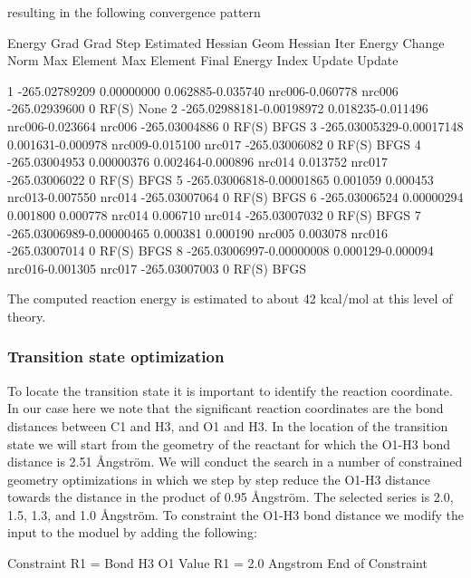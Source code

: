 resulting in the following convergence pattern

\begin{sourcelisting}
                      Energy     Grad     Grad          Step           Estimated  Hessian Geom Hessian
Iter     Energy       Change     Norm      Max  Element  Max  Element  Final Energy Index Update Update

 1   -265.02789209 0.00000000 0.062885-0.035740 nrc006-0.060778  nrc006 -265.02939600  0  RF(S)   None
 2   -265.02988181-0.00198972 0.018235-0.011496 nrc006-0.023664  nrc006 -265.03004886  0  RF(S)   BFGS
 3   -265.03005329-0.00017148 0.001631-0.000978 nrc009-0.015100  nrc017 -265.03006082  0  RF(S)   BFGS
 4   -265.03004953 0.00000376 0.002464-0.000896 nrc014 0.013752  nrc017 -265.03006022  0  RF(S)   BFGS
 5   -265.03006818-0.00001865 0.001059 0.000453 nrc013-0.007550  nrc014 -265.03007064  0  RF(S)   BFGS
 6   -265.03006524 0.00000294 0.001800 0.000778 nrc014 0.006710  nrc014 -265.03007032  0  RF(S)   BFGS
 7   -265.03006989-0.00000465 0.000381 0.000190 nrc005 0.003078  nrc016 -265.03007014  0  RF(S)   BFGS
 8   -265.03006997-0.00000008 0.000129-0.000094 nrc016-0.001305  nrc017 -265.03007003  0  RF(S)   BFGS
\end{sourcelisting}

The computed reaction energy is estimated to about 42 kcal/mol at this level of theory. 

\subsubsection{Transition state optimization}

To locate the transition state it is important to identify the reaction coordinate.
In our case here we note that the significant reaction coordinates are the bond distances between C1 
and H3, and O1 and H3. In the location of the transition state we
will start from the geometry of the reactant for which the O1-H3 bond distance is 
2.51 {\AA}ngstr\"{o}m. We will conduct the search in a number of constrained geometry 
optimizations in which we step by step reduce the O1-H3 distance towards the distance
in the product of 0.95 {\AA}ngstr\"{o}m. The selected series is 2.0, 1.5, 1.3, and 
1.0 {\AA}ngstr\"{o}m. 
To constraint the O1-H3 bond distance we modify the input to the 
 moduel by adding the following:

\begin{inputlisting}
Constraint
R1 = Bond H3 O1
Value
R1 = 2.0 Angstrom
End of Constraint
\end{inputlisting}


